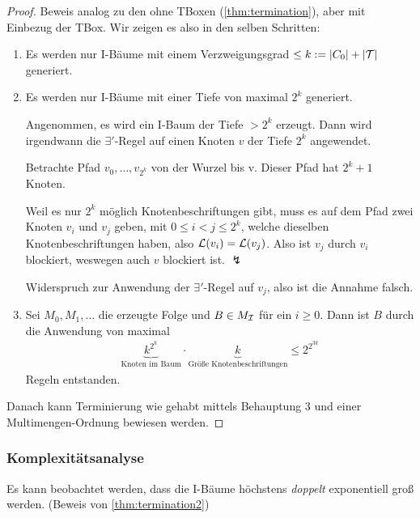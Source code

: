 \begin{proof}
    Beweis analog zu den ohne TBoxen (\autoref{thm:termination}), aber mit Einbezug der TBox. Wir zeigen es also in den selben Schritten:

\begin{enumerate}
\item
  Es werden nur I-Bäume mit einem Verzweigungsgrad $\leq k := \left| C_0 \right| + \left| \MT \right|$ generiert.
\item
  Es werden nur I-Bäume mit einer Tiefe von maximal $2^k$ generiert.
  \begin{tafel}
  Angenommen, es wird ein I-Baum der Tiefe $> 2^k$ erzeugt. Dann wird irgendwann die $\exists '$-Regel auf einen Knoten $v$ der Tiefe $2^k$ angewendet.

  Betrachte Pfad $v_0, \ldots , v_{2^k}$ von der Wurzel bis v. Dieser Pfad hat $2^k+1$ Knoten.

  Weil es nur $2^k$ möglich Knotenbeschriftungen gibt, muss es auf dem Pfad zwei Knoten $v_i$ und $v_j$ geben, mit $0 \leq i < j \leq 2^k$, welche dieselben Knotenbeschriftungen haben, also $\mathcal{L}(v_i) = \mathcal{L}(v_j)$. Also ist $v_j$ durch $v_i$ blockiert, weswegen auch $v$ blockiert ist. $\lightning$

  Widerspruch zur Anwendung der $\exists '$-Regel auf $v_j$, also ist die Annahme falsch.
  \end{tafel}
\item
  Sei $M_0,M_1,\ldots$ die erzeugte Folge und $B \in M_{\mathcal{I}}$ für
  ein $i \geq 0$. Dann ist $B$ durch die Anwendung von maximal
  \begin{align*}
      \underbrace{k^{2^k}}_\text{Knoten im Baum} \cdot
      \underbrace{k}_\text{Größe Knotenbeschriftungen} \leq 2^{2^{3k}}
  \end{align*}
  Regeln entstanden.
\end{enumerate}

Danach kann Terminierung wie gehabt mittels Behauptung 3 und einer Multimengen-Ordnung bewiesen werden.

\end{proof}

\subsubsection{Komplexitätsanalyse}

Es kann beobachtet werden, dass die I-Bäume höchstens \emph{doppelt} exponentiell groß werden. (Beweis von \autoref{thm:termination2})

